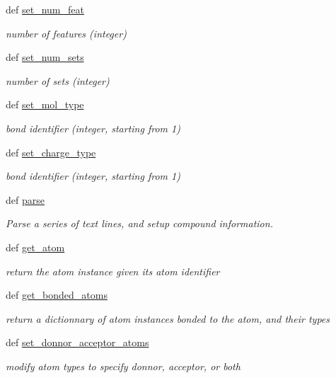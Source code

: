 \begin{DoxyCompactItemize}
def \hyperlink{classforcebalance_1_1Mol2_1_1mol2_ab5de4b8eef6e851d9be12ecb92cf8f86}{set\-\_\-num\-\_\-feat}
\begin{DoxyCompactList}\small\item\em number of features (integer) \end{DoxyCompactList}\item 
def \hyperlink{classforcebalance_1_1Mol2_1_1mol2_a981c9a485d4db6abbcb61b8188090078}{set\-\_\-num\-\_\-sets}
\begin{DoxyCompactList}\small\item\em number of sets (integer) \end{DoxyCompactList}\item 
def \hyperlink{classforcebalance_1_1Mol2_1_1mol2_a6ee55f5fae46cee9c0e7d6683c9b5c50}{set\-\_\-mol\-\_\-type}
\begin{DoxyCompactList}\small\item\em bond identifier (integer, starting from 1) \end{DoxyCompactList}\item 
def \hyperlink{classforcebalance_1_1Mol2_1_1mol2_aaab9bc1afebb05a355c53db2a35740be}{set\-\_\-charge\-\_\-type}
\begin{DoxyCompactList}\small\item\em bond identifier (integer, starting from 1) \end{DoxyCompactList}\item 
def \hyperlink{classforcebalance_1_1Mol2_1_1mol2_a8d49f0024dfe625e1b43a244ec76f3b3}{parse}
\begin{DoxyCompactList}\small\item\em \-Parse a series of text lines, and setup compound information. \end{DoxyCompactList}\item 
def \hyperlink{classforcebalance_1_1Mol2_1_1mol2_af5a261aefed1c65fd5f56b5b30e69995}{get\-\_\-atom}
\begin{DoxyCompactList}\small\item\em return the atom instance given its atom identifier \end{DoxyCompactList}\item 
def \hyperlink{classforcebalance_1_1Mol2_1_1mol2_a2d2b34613f2b72ad3a7fcdc94a3de994}{get\-\_\-bonded\-\_\-atoms}
\begin{DoxyCompactList}\small\item\em return a dictionnary of atom instances bonded to the atom, and their types \end{DoxyCompactList}\item 
def \hyperlink{classforcebalance_1_1Mol2_1_1mol2_aa5a8b41dee69923e1854b0385ba588a4}{set\-\_\-donnor\-\_\-acceptor\-\_\-atoms}
\begin{DoxyCompactList}\small\item\em modify atom types to specify donnor, acceptor, or both \end{DoxyCompactList}\end{DoxyCompactItemize}
